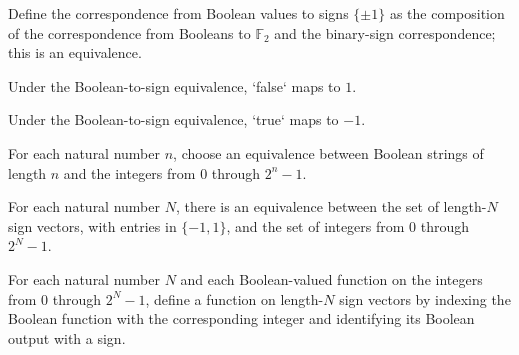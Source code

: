 \begin{definition}
\label{FABL.pcppBoolSignEquiv}
\leanok
{}
Define the correspondence from Boolean values to signs $\{\pm 1\}$ as the composition of
the correspondence from Booleans to $\mathbb{F}_2$ and the binary-sign correspondence;
this is an equivalence.
\end{definition}

\begin{theorem}
\label{FABL.pcppBoolSignEquiv_false}
\leanok
{}
Under the Boolean-to-sign equivalence, `false` maps to $1$.
\end{theorem}

\begin{theorem}
\label{FABL.pcppBoolSignEquiv_true}
\leanok
{}
Under the Boolean-to-sign equivalence, `true` maps to $-1$.
\end{theorem}

\begin{definition}
\label{FABL.booleanStringIndexEquiv}
\leanok
For each natural number $n$, choose an equivalence between Boolean strings of length $n$
and the integers from $0$ through $2^n-1$.
\end{definition}

\begin{definition}
\label{FABL.signCubeIndexEquiv}
\leanok
{}
For each natural number $N$, there is an equivalence between the set of length-$N$ sign
vectors, with entries in $\{ -1,1\}$, and the set of integers from $0$ through
$2^N-1$.
\end{definition}

\begin{definition}
\label{FABL.pcppProofFunction}
\leanok
{}
For each natural number $N$ and each Boolean-valued function on the integers from $0$
through $2^N-1$, define a function on length-$N$ sign vectors by indexing the Boolean
function with the corresponding integer and identifying its Boolean output with a sign.
\end{definition}

